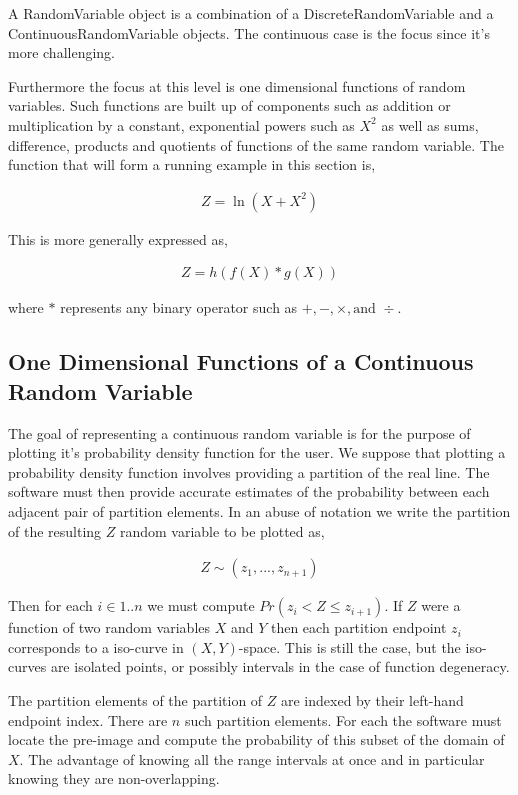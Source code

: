 A RandomVariable object is a combination of a DiscreteRandomVariable and a ContinuousRandomVariable objects. The continuous case is the focus since it's more challenging. 

Furthermore the focus at this level is one dimensional functions of random variables. Such functions are built up of components such as addition or multiplication by a constant, exponential powers such as $X^2$ as well as sums, difference, products and quotients of functions of the same random variable. The function that will form a running example in this section is,

\begin{align*}
Z = \ln(X + X^2)
\end{align*}

This is more generally expressed as,

\begin{align*}
Z = h(f(X) * g(X))
\end{align*}

where $*$ represents any binary operator such as $+, -, \times, \text{and } \div$.

\subsection{One Dimensional Functions of a Continuous Random Variable}

The goal of representing a continuous random variable is for the purpose of plotting it's probability density function for the user. We suppose that plotting a probability density function involves providing a partition of the real line. The software must then provide accurate estimates of the probability between each adjacent pair of partition elements. In an abuse of notation we write the partition of the resulting $Z$ random variable to be plotted as,

\begin{align*}
Z \sim (z_1, ..., z_{n+1})
\end{align*}

Then for each $i \in 1..n$ we must compute $Pr(z_i < Z \le z_{i+1})$. If $Z$ were a function of two random variables $X$ and $Y$ then each partition endpoint $z_i$ corresponds to a iso-curve in $(X,Y)$-space. This is still the case, but the iso-curves are isolated points, or possibly intervals in the case of function degeneracy.

The partition elements of the partition of $Z$ are indexed by their left-hand endpoint index. There are $n$ such partition elements. For each the software must locate the pre-image and compute the probability of this subset of the domain of $X$. The advantage of knowing all the range intervals at once and in particular knowing they are non-overlapping.

